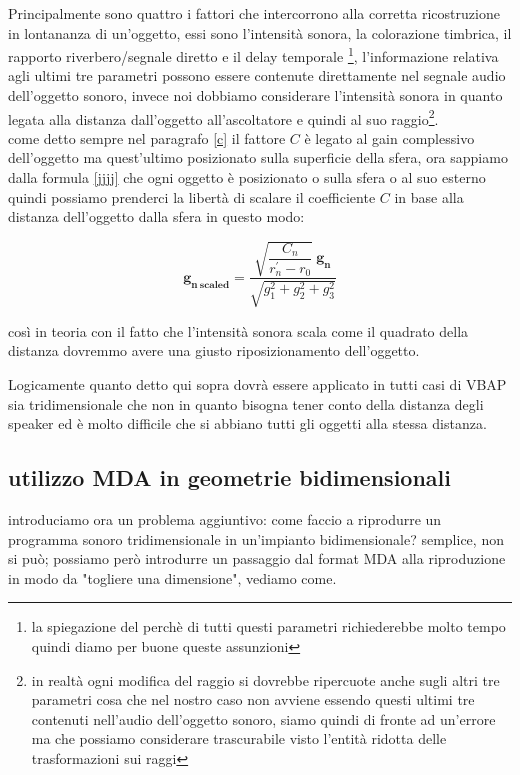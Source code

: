 \documentclass[12pt,a4paper]{report}
\begin{document}
Principalmente sono quattro i fattori che intercorrono alla corretta ricostruzione in lontananza di un'oggetto, essi sono l'intensità sonora, la colorazione timbrica, il rapporto riverbero/segnale diretto e il delay temporale \footnote{la spiegazione del perchè di tutti questi parametri richiederebbe molto tempo quindi diamo per buone queste assunzioni}, l'informazione relativa agli ultimi tre parametri possono essere contenute direttamente nel segnale audio dell'oggetto sonoro, invece noi dobbiamo considerare l'intensità sonora in quanto legata alla distanza dall'oggetto all'ascoltatore e quindi al suo raggio\footnote{in realtà ogni modifica del raggio si dovrebbe ripercuote anche sugli altri tre parametri cosa che nel nostro caso non avviene essendo questi ultimi tre contenuti nell'audio dell'oggetto sonoro, siamo quindi di fronte ad un'errore ma che possiamo considerare trascurabile visto l'entità ridotta delle trasformazioni sui raggi }.\\

come detto sempre nel paragrafo \ref{c} il fattore $C$ è legato al gain complessivo dell'oggetto ma quest'ultimo posizionato sulla superficie della sfera, ora sappiamo dalla formula \ref{jjjj} che ogni oggetto è posizionato o sulla sfera o al suo esterno quindi possiamo prenderci la libertà di scalare il coefficiente $C$ in base alla distanza dell'oggetto dalla sfera in questo modo:

\begin{equation}
\boldsymbol{g_{n\ scaled}} = \dfrac{\sqrt{\dfrac{C_n}{r_n^{\prime}-r_0}}\ \boldsymbol{g_n}}{\sqrt{g_1^2 +g_2^2 + g_3^2}}
\label{kkkk}
\end{equation}

così in teoria con il fatto che l'intensità sonora scala come il quadrato della distanza dovremmo avere una giusto riposizionamento dell'oggetto.

Logicamente quanto detto qui sopra dovrà essere applicato in tutti casi di VBAP sia tridimensionale che non in quanto bisogna tener conto della distanza degli speaker ed è molto difficile che si abbiano tutti gli oggetti alla stessa distanza.\\

\subsection{utilizzo MDA in geometrie bidimensionali}

introduciamo ora un problema aggiuntivo: come faccio a riprodurre un programma sonoro tridimensionale in un'impianto bidimensionale? semplice, non si può; possiamo però introdurre un passaggio dal format MDA alla riproduzione in modo da "togliere una dimensione", vediamo come.\\
\end{document}
